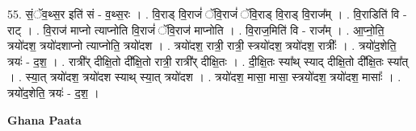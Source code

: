 \documentclass[17pt]{extarticle}
\begin{document}
55. सं॒ॅव॒थ्स॒र इति॑ सं - व॒थ्स॒रः । . वि॒राड् वि॒राजं॑ ॅवि॒राजं॑ ॅवि॒राड् वि॒राड् वि॒राज᳚म् । . वि॒राडिति॑ वि - राट् । . वि॒राज॑ माप्नो त्याप्नोति वि॒राजं॑ ॅवि॒राज॑ माप्नोति । . वि॒राज॒मिति॑ वि - राज᳚म् । . आ॒प्नो॒ति॒ त्रयो॑दश॒ त्रयो॑दशाप्नो त्याप्नोति॒ त्रयो॑दश । . त्रयो॑दश॒ रात्री॒ रात्री॒ स्त्रयो॑दश॒ त्रयो॑दश॒ रात्रीः᳚ । . त्रयो॑द॒शेति॒ त्रयः॑ - द॒श॒ । . रात्री᳚र् दीक्षि॒तो दी᳚क्षि॒तो रात्री॒ रात्री᳚र् दीक्षि॒तः । . दी॒क्षि॒तः स्या᳚थ् स्याद् दीक्षि॒तो दी᳚क्षि॒तः स्या᳚त् । . स्या॒त् त्रयो॑दश॒ त्रयो॑दश स्याथ् स्या॒त् त्रयो॑दश । . त्रयो॑दश॒ मासा॒ मासा॒ स्त्रयो॑दश॒ त्रयो॑दश॒ मासाः᳚ । . त्रयो॑द॒शेति॒ त्रयः॑ - द॒श॒ । \newline

\textbf{Ghana Paata } \newline
\end{document}
